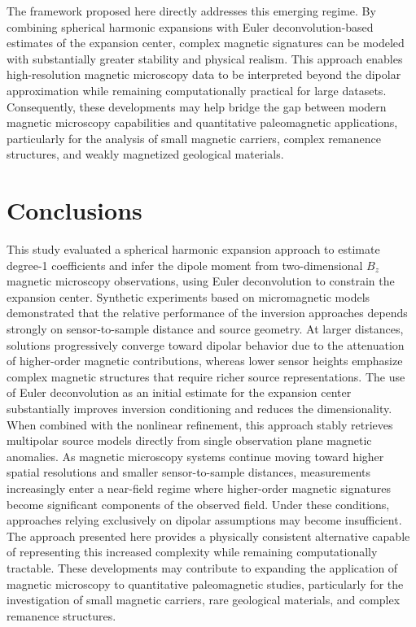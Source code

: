 The framework proposed here directly addresses this emerging regime. By combining spherical harmonic expansions with Euler deconvolution-based estimates of the expansion center, complex magnetic signatures can be modeled with substantially greater stability and physical realism. This approach enables high-resolution magnetic microscopy data to be interpreted beyond the dipolar approximation while remaining computationally practical for large datasets. Consequently, these developments may help bridge the gap between modern magnetic microscopy capabilities and quantitative paleomagnetic applications, particularly for the analysis of small magnetic carriers, complex remanence structures, and weakly magnetized geological materials.


\section{Conclusions}

This study evaluated a spherical harmonic expansion approach to estimate degree-1 coefficients and infer the dipole moment from two-dimensional $B_z$ magnetic microscopy observations, using Euler deconvolution to constrain the expansion center. Synthetic experiments based on micromagnetic models demonstrated that the relative performance of the inversion approaches depends strongly on sensor-to-sample distance and source geometry. At larger distances, solutions progressively converge toward dipolar behavior due to the attenuation of higher-order magnetic contributions, whereas lower sensor heights emphasize complex magnetic structures that require richer source representations. The use of Euler deconvolution as an initial estimate for the expansion center substantially improves inversion conditioning and reduces the dimensionality. When combined with the nonlinear refinement, this approach stably retrieves multipolar source models directly from single observation plane magnetic anomalies. As magnetic microscopy systems continue moving toward higher spatial resolutions and smaller sensor-to-sample distances, measurements increasingly enter a near-field regime where higher-order magnetic signatures become significant components of the observed field. Under these conditions, approaches relying exclusively on dipolar assumptions may become insufficient. The approach presented here provides a physically consistent alternative capable of representing this increased complexity while remaining computationally tractable. These developments may contribute to expanding the application of magnetic microscopy to quantitative paleomagnetic studies, particularly for the investigation of small magnetic carriers, rare geological materials, and complex remanence structures.


